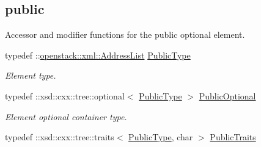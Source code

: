 \subsection*{public}
\label{_amgrp4c9184f37cff01bcdc32dc486ec36961}
Accessor and modifier functions for the public optional element. \begin{DoxyCompactItemize}
\item 
\hypertarget{classopenstack_1_1xml_1_1Addresses_ad234c7cc581b8ac528d9b1c785c7d704}{
typedef ::\hyperlink{classopenstack_1_1xml_1_1AddressList}{openstack::xml::AddressList} \hyperlink{classopenstack_1_1xml_1_1Addresses_ad234c7cc581b8ac528d9b1c785c7d704}{PublicType}}
\label{classopenstack_1_1xml_1_1Addresses_ad234c7cc581b8ac528d9b1c785c7d704}

\begin{DoxyCompactList}\small\item\em Element type. \item\end{DoxyCompactList}\item 
\hypertarget{classopenstack_1_1xml_1_1Addresses_a92f6f7282346412c4c85b46340dba3a6}{
typedef ::xsd::cxx::tree::optional$<$ \hyperlink{classopenstack_1_1xml_1_1AddressList}{PublicType} $>$ \hyperlink{classopenstack_1_1xml_1_1Addresses_a92f6f7282346412c4c85b46340dba3a6}{PublicOptional}}
\label{classopenstack_1_1xml_1_1Addresses_a92f6f7282346412c4c85b46340dba3a6}

\begin{DoxyCompactList}\small\item\em Element optional container type. \item\end{DoxyCompactList}\item 
\hypertarget{classopenstack_1_1xml_1_1Addresses_abfa6f2f137caf6ee5b7949101b8ec39f}{
typedef ::xsd::cxx::tree::traits$<$ \hyperlink{classopenstack_1_1xml_1_1AddressList}{PublicType}, char $>$ \hyperlink{classopenstack_1_1xml_1_1Addresses_abfa6f2f137caf6ee5b7949101b8ec39f}{PublicTraits}}
\label{classopenstack_1_1xml_1_1Addresses_abfa6f2f137caf6ee5b7949101b8ec39f}


\end{DoxyCompactItemize}
